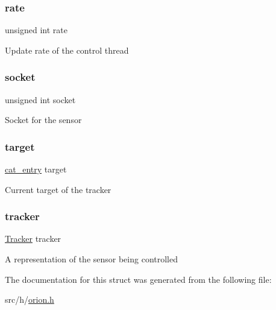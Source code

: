 \subsubsection{\texorpdfstring{rate}{rate}}
{\footnotesize\ttfamily unsigned int rate}

Update rate of the control thread \mbox{\label{struct_orion_a13301f1712f628ef6520dfe1f4e4b70d}} 
\subsubsection{\texorpdfstring{socket}{socket}}
{\footnotesize\ttfamily unsigned int socket}

Socket for the sensor \mbox{\label{struct_orion_a4aa5babb303788c009f95322895c2e6c}} 
\subsubsection{\texorpdfstring{target}{target}}
{\footnotesize\ttfamily \mbox{\hyperlink{novas_8h_a262daaa71cede05205cfaa727313c1f3}{cat\+\_\+entry}} target}

Current target of the tracker \mbox{\label{struct_orion_a495e6bf1af7804551f312afd3bd7032a}} 
\subsubsection{\texorpdfstring{tracker}{tracker}}
{\footnotesize\ttfamily \mbox{\hyperlink{struct_tracker}{Tracker}} tracker}

A representation of the sensor being controlled 

The documentation for this struct was generated from the following file\+:\begin{DoxyCompactItemize}
\item 
src/h/\mbox{\hyperlink{orion_8h}{orion.\+h}}\end{DoxyCompactItemize}
